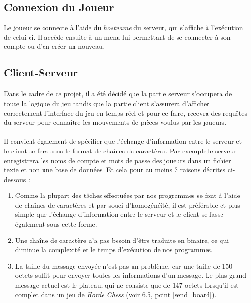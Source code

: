 \documentclass[10pt, a4paper]{article}
\begin{document}
\newpage

\subsection{Connexion du Joueur}
Le joueur se connecte à l'aide du \textit{hostname} du serveur, qui s'affiche à l'exécution de celui-ci. Il accède ensuite à un menu lui permettant de se connecter à son compte ou d'en créer un nouveau.


\subsection{Client-Serveur}
\paragraph{}Dans le cadre de ce projet, il a été décidé que la partie serveur s'occupera de toute la logique du jeu tandis que la partie client s'assurera d'afficher correctement l'interface du jeu en temps réel et pour ce faire, recevra des requêtes du serveur pour connaître les mouvements de pièces voulus par les joueurs.
\paragraph{}Il convient également de spécifier que l'échange d'information entre le serveur et le client se fera sous le format de chaînes de caractères. Par exemple,le serveur enregistrera les noms de compte et mots de passe des joueurs dans un fichier texte et non une base de données. Et cela pour au moins 3 raisons décrites ci-dessous :
\begin{enumerate}
\item Comme la plupart des tâches effectuées par nos programmes se font à l'aide de chaînes de caractères et par souci d'homogénéité, il est préférable et plus simple que l'échange d'information entre le serveur et le client se fasse également sous cette forme.
\item Une chaîne de caractère n'a pas besoin d'être traduite en binaire, ce qui diminue la complexité et le temps d'exécution de nos programmes.
\item La taille du message envoyée n'est pas un problème, car une taille de 150 octets suffit pour envoyer toutes les informations d'un message. Le plus grand message actuel est le plateau, qui ne consiste que de 147 octets lorsqu'il est complet dans un jeu de \textit{Horde Chess} (voir 6.5, point \ref{send_board}).
\end{enumerate}
\end{document}
